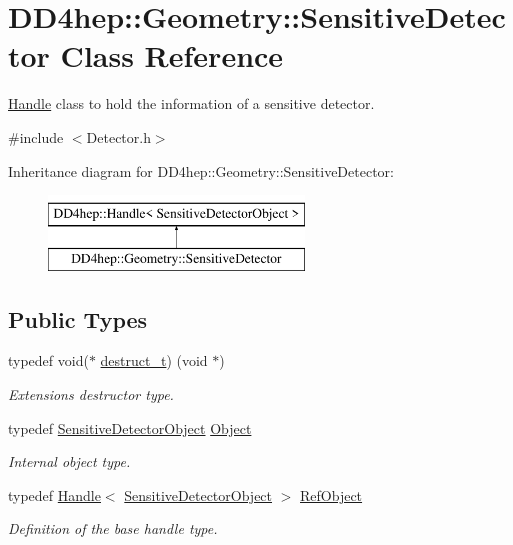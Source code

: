\hypertarget{class_d_d4hep_1_1_geometry_1_1_sensitive_detector}{}\section{D\+D4hep\+:\+:Geometry\+:\+:Sensitive\+Detector Class Reference}
\label{class_d_d4hep_1_1_geometry_1_1_sensitive_detector}


\hyperlink{class_d_d4hep_1_1_handle}{Handle} class to hold the information of a sensitive detector.  




{\ttfamily \#include $<$Detector.\+h$>$}

Inheritance diagram for D\+D4hep\+:\+:Geometry\+:\+:Sensitive\+Detector\+:\begin{figure}[H]
\begin{center}
\leavevmode
\includegraphics[height=2.000000cm]{class_d_d4hep_1_1_geometry_1_1_sensitive_detector}
\end{center}
\end{figure}
\subsection*{Public Types}
\begin{DoxyCompactItemize}
\item 
typedef void($\ast$ \hyperlink{class_d_d4hep_1_1_geometry_1_1_sensitive_detector_a783d0249ce87263b68232451b0159bec}{destruct\+\_\+t}) (void $\ast$)
\begin{DoxyCompactList}\small\item\em Extensions destructor type. \end{DoxyCompactList}\item 
typedef \hyperlink{class_d_d4hep_1_1_geometry_1_1_sensitive_detector_object}{Sensitive\+Detector\+Object} \hyperlink{class_d_d4hep_1_1_geometry_1_1_sensitive_detector_a0d3dbe95cad52849050e35e70a5cf784}{Object}
\begin{DoxyCompactList}\small\item\em Internal object type. \end{DoxyCompactList}\item 
typedef \hyperlink{class_d_d4hep_1_1_handle}{Handle}$<$ \hyperlink{class_d_d4hep_1_1_geometry_1_1_sensitive_detector_object}{Sensitive\+Detector\+Object} $>$ \hyperlink{class_d_d4hep_1_1_geometry_1_1_sensitive_detector_a6283afdc6a1de8128bd6aea54f030014}{Ref\+Object}
\begin{DoxyCompactList}\small\item\em Definition of the base handle type. \end{DoxyCompactList}\end{DoxyCompactItemize}
